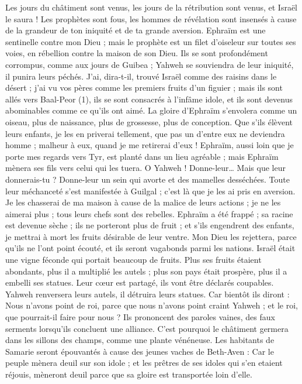 \begin{multicols}{2}
Les jours du châtiment sont venus, les jours de la rétribution sont venus, et Israël le saura ! Les prophètes sont fous, les hommes de révélation sont insensés à cause de la grandeur de ton iniquité et de ta grande aversion.
Ephraïm est une sentinelle contre mon Dieu ; mais le prophète est un filet d'oiseleur sur toutes ses voies, en rébellion contre la maison de son Dieu.
Ils se sont profondément corrompus, comme aux jours de Guibea ; Yahweh se souviendra de leur iniquité, il punira leurs péchés.
J’ai, dira-t-il, trouvé Israël comme des raisins dans le désert ; j'ai vu vos pères comme les premiers fruits d’un figuier ; mais ils sont allés vers Baal-Peor (1), ils se sont consacrés à l’infâme idole, et ils sont devenus abominables comme ce qu'ils ont aimé.
La gloire d'Ephraïm s'envolera comme un oiseau, plus de naissance, plus de grossesse, plus de conception.
Que s'ils élèvent leurs enfants, je les en priverai tellement, que pas un d'entre eux ne deviendra homme ; malheur à eux, quand je me retirerai d'eux !
Ephraïm, aussi loin que je porte mes regards vers Tyr, est planté dans un lieu agréable ; mais Ephraïm mènera ses fils vers celui qui les tuera.
O Yahweh ! Donne-leur… Mais que leur donnerais-tu ? Donne-leur un sein qui avorte et des mamelles desséchées.
Toute leur méchanceté s’est manifestée à Guilgal ; c’est là que je les ai pris en aversion. Je les chasserai de ma maison à cause de la malice de leurs actions ; je ne les aimerai plus ; tous leurs chefs sont des rebelles.
Ephraïm a été frappé ; sa racine est devenue sèche ; ils ne porteront plus de fruit ; et s'ils engendrent des enfants, je mettrai à mort les fruits désirable de leur ventre.
Mon Dieu les rejettera, parce qu'ils ne l'ont point écouté, et ils seront vagabonds parmi les nations.
\VerseOne{}Israël était une vigne féconde qui portait beaucoup de fruits. Plus ses fruits étaient abondants, plus il a multiplié les autels ; plus son pays était prospère, plus il a embelli ses statues.
Leur cœur est partagé, ils vont être déclarés coupables. Yahweh renversera leurs autels, il détruira leurs statues.
Car bientôt ils diront : Nous n'avons point de roi, parce que nous n'avons point craint Yahweh ; et le roi, que pourrait-il faire pour nous ?
Ils prononcent des paroles vaines, des faux serments lorsqu’ils concluent une alliance. C'est pourquoi le châtiment germera dans les sillons des champs, comme une plante vénéneuse.
Les habitants de Samarie seront épouvantés à cause des jeunes vaches de Beth-Aven : Car le peuple mènera deuil sur son idole ; et les prêtres de ses idoles qui s'en etaient réjouis, mèneront deuil parce que sa gloire est transportée loin d'elle.

\end{multicols}
